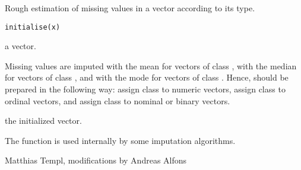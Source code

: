 %
\begin{Description}\relax
Rough estimation of missing values in a vector according to its type.
\end{Description}
%
\begin{Usage}
\begin{verbatim}
initialise(x)
\end{verbatim}
\end{Usage}
%
\begin{Arguments}
\begin{ldescription}
\item[\code{x}] a vector.
\end{ldescription}
\end{Arguments}
%
\begin{Details}\relax
Missing values are imputed with the mean for vectors of class 
, with the median for vectors of class , 
and with the mode for vectors of class .  Hence,  
should be prepared in the following way: assign class  
to numeric vectors, assign class  to ordinal  vectors, 
and assign class  to nominal or binary  vectors. 
\end{Details}
%
\begin{Value}
the initialized vector.
\end{Value}
%
\begin{Note}\relax
  
The function is used internally by some imputation algorithms.
\end{Note}
%
\begin{Author}\relax
Matthias Templ, modifications by Andreas Alfons
\end{Author}
